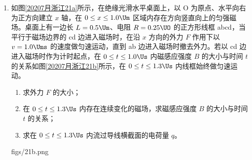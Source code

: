 \documentclass[\gkver]{gaokaozhenti}
\begin{document}
\begin{enumerate}
{（3）滑块运动到距 A 点 $x$ 处的速度为 $v$，动能定理 $mgH-\mu mgx=\frac{1}{2}mv^{2}$，碰撞后的速度为 $v'$，动量守恒定律 $mv=3mv'$，设碰撞后滑块滑到斜轨道的高度为 $h$，动能定理

$-3\mu mg(L_{AB}-x)-3\mu mg\frac{h}{\tan\theta}-3mgh=0-\frac{1}{2}(3m)v'^{2}$

得 $h=\frac{1}{6}x-\frac{5}{48}$（$\frac{5}{8}\Um<x\leq1\Um$），$h=0$（$0\leq x\leq\frac{5}{8}\Um$）。
}

\item
如图\ref{20207月浙江21a}所示，在绝缘光滑水平桌面上，以 O 为原点、水平向右为正方向建立 $x$ 轴，在 $0\leq x\leq1.0\Um$ 区域内存在方向竖直向上的匀强磁场。桌面上有一边长 $L=0.5\Um$、电阻 $R=0.25\UO$ 的正方形线框 abcd，当平行于磁场边界的 cd 边进入磁场时，在沿 $x$ 方向的外力 $F$ 作用下以 $v=1.0\Ums$ 的速度做匀速运动，直到 ab 边进入磁场时撤去外力。若以 cd 边进入磁场时作为计时起点，在 $0\leq t\leq1.0\Us$ 内磁感应强度 $B$ 的大小与时间 $t$ 的关系如图\ref{20207月浙江21b}所示，在 $0\leq t\leq1.3\Us$ 内线框始终做匀速运动。
\begin{enumerate}
	\item
	求外力 $F$ 的大小；
	\item
	在 $0\leq t\leq1.3\Us$ 内存在连续变化的磁场，求磁感应强度 $B$ 的大小与时间 $t$ 的关系；
	\item
	求在 $0\leq t\leq1.3\Us$ 内流过导线横截面的电荷量 $q$。
\end{enumerate}

{figs/21b.png}


\end{enumerate}
\end{document}
